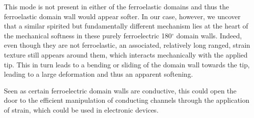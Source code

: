 This mode is not present in either of the ferroelastic domains and thus the ferroelastic domain wall would appear softer.
In our case, however, we uncover that a similar spirited but fundamentally different mechanism lies at the heart of the mechanical softness in these purely ferroelectric 180$^\circ$ domain walls.
Indeed, even though they are not ferroelastic, an associated, relatively long ranged, strain texture still appears around them, which interacts mechanically with the applied tip.
This in turn leads to a bending or sliding of the domain wall towards the tip, leading to a large deformation and thus an apparent softening.

Seen as certain ferroelectric domain walls are conductive, this could open the door to the efficient manipulation of conducting channels through the application of strain, which could be used in electronic devices.

